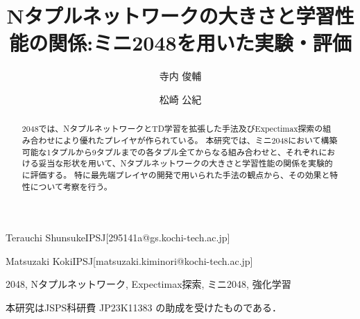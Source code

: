 \documentclass[submit,techrep,noauthor,platex,dvipdfmx]{ipsj}
\begin{document}
\title{Nタプルネットワークの大きさと学習性能の関係:ミニ2048を用いた実験・評価}

\etitle{}




\author{寺内 俊輔}{Terauchi Shunsuke}{IPSJ}[295141a@gs.kochi-tech.ac.jp]
\author{松崎 公紀}{Matsuzaki Koki}{IPSJ}[matsuzaki.kiminori@kochi-tech.ac.jp]

\begin{abstract}
    2048では、NタプルネットワークとTD学習を拡張した手法及びExpectimax探索の組み合わせにより優れたプレイヤが作られている。
    本研究では、ミニ2048において構築可能な1タプルから9タプルまでの各タプル全てからなる組み合わせと、それぞれにおける妥当な形状を用いて、Nタプルネットワークの大きさと学習性能の関係を実験的に評価する。
    特に最先端プレイヤの開発で用いられた手法の観点から、その効果と特性について考察を行う。
\end{abstract}


\begin{jkeyword}
2048, Nタプルネットワーク, Expectimax探索, ミニ2048, 強化学習
\end{jkeyword}


\maketitle






\begin{acknowledgment}
    本研究はJSPS科研費 JP23K11383 の助成を受けたものである．
\end{acknowledgment}

\def\newblock{}

% 


\end{document}
